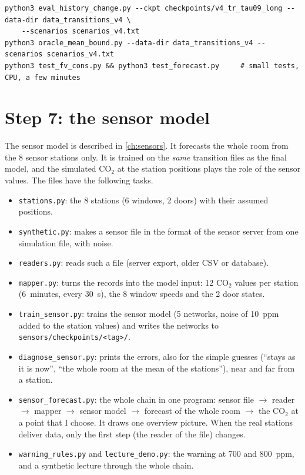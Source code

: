 \begin{lstlisting}[breaklines=true,postbreak=\space]
python3 eval_history_change.py --ckpt checkpoints/v4_tr_tau09_long --data-dir data_transitions_v4 \
    --scenarios scenarios_v4.txt
python3 oracle_mean_bound.py --data-dir data_transitions_v4 --scenarios scenarios_v4.txt
python3 test_fv_cons.py && python3 test_forecast.py     # small tests, CPU, a few minutes
\end{lstlisting}


\section{Step 7: the sensor model}
The sensor model is described in \cref{ch:sensors}. It forecasts the whole room from the 8 sensor stations only. It is trained on the \emph{same} transition files as
the final model, and the simulated CO$_2$ at the station positions plays the role of the sensor values. The files have
the following tasks.
\begin{itemize}
  \item \texttt{stations.py}: the 8 stations (6 windows, 2 doors) with their assumed positions.
  \item \texttt{synthetic.py}: makes a sensor file in the format of the sensor server from one simulation file, with noise.
  \item \texttt{readers.py}: reads such a file (server export, older CSV or database).
  \item \texttt{mapper.py}: turns the records into the model input: 12 CO$_2$ values per station (6~minutes, every 30~s), the 8 window
        speeds and the 2 door states.
  \item \texttt{train\_sensor.py}: trains the sensor model (5 networks, noise of 10~ppm added to the station values) and
        writes the networks to \texttt{sensors/checkpoints/<tag>/}.
  \item \texttt{diagnose\_sensor.py}: prints the errors, also for the simple guesses (``stays as it is now'', ``the whole room at the
        mean of the stations''), near and far from a station.
  \item \texttt{sensor\_forecast.py}: the whole chain in one program: sensor file $\rightarrow$ reader $\rightarrow$ mapper $\rightarrow$ sensor model
        $\rightarrow$ forecast of the whole room $\rightarrow$ the CO$_2$ at a point that I choose. It draws one overview picture.
        When the real stations deliver data, only the first step (the reader of the file) changes.
  \item \texttt{warning\_rules.py} and \texttt{lecture\_demo.py}: the warning at 700 and 800~ppm, and a synthetic lecture through the whole chain.
\end{itemize}

